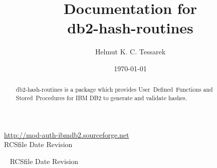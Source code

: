 \documentclass[11pt,letterpaper]{article}
\date{\today}
\author{Helmut K. C. Tessarek}
\title{Documentation for\\
db2-hash-routines}
\begin{document}
\maketitle
\setcounter{page}{0}
\thispagestyle{empty}
\begin{abstract}
db2-hash-routines is a package which provides \mbox{User Defined Functions} and \mbox{Stored Procedures} for IBM\textsuperscript{\textregistered}{} DB2\textsuperscript{\textregistered}{} to generate and validate \mbox{hashes}.
\end{abstract}

\vfill

\begin{center}
\href{http://mod-auth-ibmdb2.sourceforge.net}{http://mod-auth-ibmdb2.sourceforge.net}\\

{\tiny \rm $ $RCSfile$ $ }
{\tiny \rm $ $Date$ $ }
{\tiny \rm $ $Revision$ $ }

\end{center}
\newpage
\renewcommand{\thepage}{\roman{page}}
\tableofcontents
\newpage
\pagestyle{fancy}
\lhead{}
\rhead{}
\cfoot{\thepage\ / \pageref*{LastPage}}
\renewcommand{\headrulewidth}{0.4pt}
\renewcommand{\footrulewidth}{0.4pt}
\renewcommand{\thepage}{\arabic{page}}
\setcounter{page}{1}


\newpage

\begin{appendix}



\end{appendix}

\begin{center}
\vspace{\fill}\ \newline
{\tiny \rm $ $RCSfile$ $ }
{\tiny \rm $ $Date$ $ }
{\tiny \rm $ $Revision$ $ }
\end{center}
\end{document}
